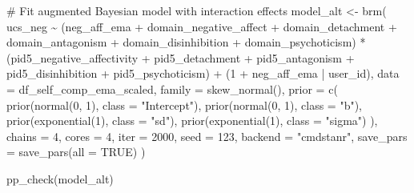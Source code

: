 \documentclass[
  11pt,
  a4paper,
  onecolumn]{article}
\newenvironment{Shaded}{}{}
\newcommand{\AttributeTok}[1]{\textcolor[rgb]{0.84,0.23,0.29}{#1}}
\newcommand{\CommentTok}[1]{\textcolor[rgb]{0.42,0.45,0.49}{#1}}
\newcommand{\ConstantTok}[1]{\textcolor[rgb]{0.00,0.36,0.77}{#1}}
\newcommand{\DecValTok}[1]{\textcolor[rgb]{0.00,0.36,0.77}{#1}}
\newcommand{\FunctionTok}[1]{\textcolor[rgb]{0.44,0.26,0.76}{#1}}
\newcommand{\NormalTok}[1]{\textcolor[rgb]{0.14,0.16,0.18}{#1}}
\newcommand{\OtherTok}[1]{\textcolor[rgb]{0.44,0.26,0.76}{#1}}
\newcommand{\SpecialCharTok}[1]{\textcolor[rgb]{0.00,0.36,0.77}{#1}}
\newcommand{\StringTok}[1]{\textcolor[rgb]{0.01,0.18,0.38}{#1}}
\begin{document}
\begin{Shaded}
\begin{Highlighting}[]
\CommentTok{\# Fit augmented Bayesian model with interaction effects}
\NormalTok{model\_alt }\OtherTok{\textless{}{-}} \FunctionTok{brm}\NormalTok{(}
\NormalTok{  ucs\_neg }\SpecialCharTok{\textasciitilde{}}
\NormalTok{    (neg\_aff\_ema }\SpecialCharTok{+}\NormalTok{ domain\_negative\_affect }\SpecialCharTok{+}\NormalTok{ domain\_detachment }\SpecialCharTok{+} 
\NormalTok{       domain\_antagonism }\SpecialCharTok{+}\NormalTok{ domain\_disinhibition }\SpecialCharTok{+}\NormalTok{ domain\_psychoticism) }\SpecialCharTok{*}
\NormalTok{      (pid5\_negative\_affectivity }\SpecialCharTok{+}\NormalTok{ pid5\_detachment }\SpecialCharTok{+}\NormalTok{ pid5\_antagonism }\SpecialCharTok{+}
\NormalTok{         pid5\_disinhibition }\SpecialCharTok{+}\NormalTok{ pid5\_psychoticism) }\SpecialCharTok{+}
\NormalTok{    (}\DecValTok{1} \SpecialCharTok{+}\NormalTok{ neg\_aff\_ema }\SpecialCharTok{|}\NormalTok{ user\_id),}
  \AttributeTok{data =}\NormalTok{ df\_self\_comp\_ema\_scaled,}
  \AttributeTok{family =} \FunctionTok{skew\_normal}\NormalTok{(),}
  \AttributeTok{prior =} \FunctionTok{c}\NormalTok{(}
    \FunctionTok{prior}\NormalTok{(}\FunctionTok{normal}\NormalTok{(}\DecValTok{0}\NormalTok{, }\DecValTok{1}\NormalTok{), }\AttributeTok{class =} \StringTok{"Intercept"}\NormalTok{),}
    \FunctionTok{prior}\NormalTok{(}\FunctionTok{normal}\NormalTok{(}\DecValTok{0}\NormalTok{, }\DecValTok{1}\NormalTok{), }\AttributeTok{class =} \StringTok{"b"}\NormalTok{),}
    \FunctionTok{prior}\NormalTok{(}\FunctionTok{exponential}\NormalTok{(}\DecValTok{1}\NormalTok{), }\AttributeTok{class =} \StringTok{"sd"}\NormalTok{),}
    \FunctionTok{prior}\NormalTok{(}\FunctionTok{exponential}\NormalTok{(}\DecValTok{1}\NormalTok{), }\AttributeTok{class =} \StringTok{"sigma"}\NormalTok{)}
\NormalTok{  ),}
  \AttributeTok{chains =} \DecValTok{4}\NormalTok{,}
  \AttributeTok{cores =} \DecValTok{4}\NormalTok{,}
  \AttributeTok{iter =} \DecValTok{2000}\NormalTok{,}
  \AttributeTok{seed =} \DecValTok{123}\NormalTok{,}
  \AttributeTok{backend =} \StringTok{"cmdstanr"}\NormalTok{,}
  \AttributeTok{save\_pars =} \FunctionTok{save\_pars}\NormalTok{(}\AttributeTok{all =} \ConstantTok{TRUE}\NormalTok{)}
\NormalTok{)}
\end{Highlighting}
\end{Shaded}

\begin{Shaded}
\begin{Highlighting}[]
\FunctionTok{pp\_check}\NormalTok{(model\_alt)}
\end{Highlighting}
\end{Shaded}
\end{document}
